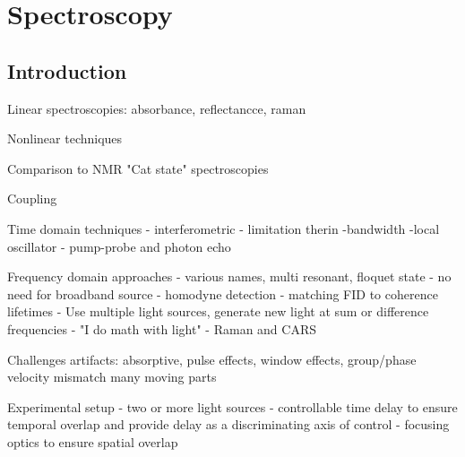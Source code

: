 \chapter{Spectroscopy} \label{cha:spec}

\clearpage

\section{Introduction}  %

Linear spectroscopies: absorbance, reflectancce, raman

Nonlinear techniques


Comparison to NMR
  "Cat state" spectroscopies

Coupling

Time domain techniques
 - interferometric
 - limitation therin
    -bandwidth
    -local oscillator
 - pump-probe and photon echo

Frequency domain approaches
 - various names, multi resonant, floquet state
 - no need for broadband source
 - homodyne detection
 - matching FID to coherence lifetimes
 - Use multiple light sources, generate new light at sum or difference frequencies
   - "I do math with light"
 - Raman and CARS

Challenges
 artifacts: absorptive, pulse effects, window effects, group/phase velocity mismatch
 many moving parts

Experimental setup
 - two or more light sources
 - controllable time delay to ensure temporal overlap and provide delay as a discriminating axis of control
 - focusing optics to ensure spatial overlap

\clearpage
